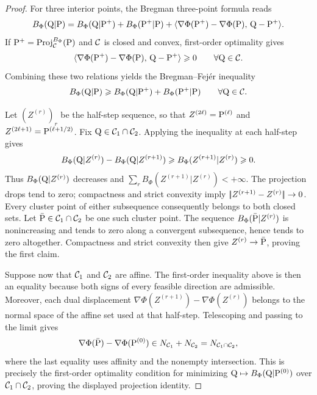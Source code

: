 \begin{proof}
	For three interior points, the Bregman three-point formula reads
	\[
		B_\Phi(\Q|\P)
		=
		B_\Phi(\Q|\P^+)
		+
		B_\Phi(\P^+|\P)
		+
		\dotp{\nabla\Phi(\P^+)-\nabla\Phi(\P)}{\Q-\P^+}.
	\]
	If $\P^+=\Proj_\Cc^{B_\Phi}(\P)$ and $\Cc$ is closed and convex, first-order optimality gives
	\[
		\dotp{\nabla\Phi(\P^+)-\nabla\Phi(\P)}{\Q-\P^+}\geq0
		\qquad \forall \Q\in\Cc.
	\]
	Combining these two relations yields the Bregman--Fej\'er inequality
	\[
		B_\Phi(\Q|\P)
		\geq
		B_\Phi(\Q|\P^+)+B_\Phi(\P^+|\P)
		\qquad\forall \Q\in\Cc.
	\]

	Let $(Z^{(r)})_r$ be the half-step sequence, so that $Z^{(2\ell)}=\P^{(\ell)}$ and $Z^{(2\ell+1)}=\P^{(\ell+1/2)}$. Fix $\Q\in\Cc_1\cap\Cc_2$. Applying the inequality at each half-step gives
	\[
		B_\Phi(\Q|Z^{(r)})-B_\Phi(\Q|Z^{(r+1)})
		\geq
		B_\Phi(Z^{(r+1)}|Z^{(r)})\geq0.
	\]
	Thus $B_\Phi(\Q|Z^{(r)})$ decreases and $\sum_r B_\Phi(Z^{(r+1)}|Z^{(r)})<+\infty$. The projection drops tend to zero; compactness and strict convexity imply $\norm{Z^{(r+1)}-Z^{(r)}}\to0$. Every cluster point of either subsequence consequently belongs to both closed sets. Let $\bar\P\in\Cc_1\cap\Cc_2$ be one such cluster point. The sequence $B_\Phi(\bar\P|Z^{(r)})$ is nonincreasing and tends to zero along a convergent subsequence, hence tends to zero altogether. Compactness and strict convexity then give $Z^{(r)}\to\bar\P$, proving the first claim.

	Suppose now that $\Cc_1$ and $\Cc_2$ are affine. The first-order inequality above is then an equality because both signs of every feasible direction are admissible. Moreover, each dual displacement
	\(\nabla\Phi(Z^{(r+1)})-\nabla\Phi(Z^{(r)})\)
	belongs to the normal space of the affine set used at that half-step. Telescoping and passing to the limit gives
	\[
		\nabla\Phi(\bar \P)-\nabla\Phi(\P^{(0)})
		\in
		N_{\Cc_1}+N_{\Cc_2}
		=
		N_{\Cc_1\cap\Cc_2},
	\]
	where the last equality uses affinity and the nonempty intersection. This is precisely the first-order optimality condition for minimizing $\Q\mapsto B_\Phi(\Q|\P^{(0)})$ over $\Cc_1\cap\Cc_2$, proving the displayed projection identity.
\end{proof}

